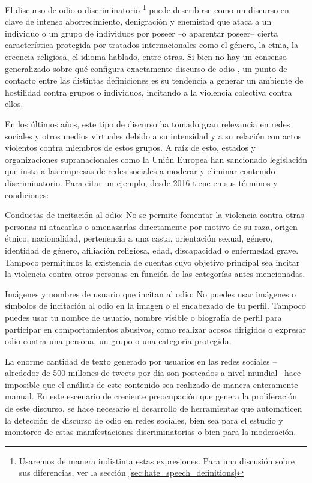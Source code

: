 
El discurso de odio o discriminatorio \footnote{Usaremos de manera indistinta estas expresiones. Para una discusión sobre sus diferencias, ver la sección \ref{sec:hate_speech_definitions}} puede describirse como un discurso en clave de intenso aborrecimiento, denigración y enemistad que ataca a un individuo o un grupo de individuos por poseer --o aparentar poseer-- cierta característica protegida por tratados internacionales como el género, la etnia, la creencia religiosa, el idioma hablado, entre otras. Si bien no hay un consenso generalizado sobre qué configura exactamente discurso de odio \cite{article192015}, un punto de contacto entre las distintas definiciones es su tendencia a generar un ambiente de hostilidad contra grupos o individuos, incitando a la violencia colectiva contra ellos.

En los últimos años, este tipo de discurso ha tomado gran relevancia en redes sociales y otros medios virtuales debido a su intensidad y a su relación con actos violentos contra miembros de estos grupos. A raíz de esto, estados y organizaciones supranacionales como la Unión Europea han sancionado legislación que insta a las empresas de redes sociales a moderar y eliminar contenido discriminatorio. Para citar un ejemplo, desde 2016 \twitter{} tiene en sus términos y condiciones:

\begin{displayquote}
    Conductas de incitación al odio: No se permite fomentar la violencia contra otras personas ni atacarlas o amenazarlas directamente por motivo de su raza, origen étnico, nacionalidad, pertenencia a una casta, orientación sexual, género, identidad de género, afiliación religiosa, edad, discapacidad o enfermedad grave. Tampoco permitimos la existencia de cuentas cuyo objetivo principal sea incitar la violencia contra otras personas en función de las categorías antes mencionadas.

    Imágenes y nombres de usuario que incitan al odio: No puedes usar imágenes o símbolos de incitación al odio en la imagen o el encabezado de tu perfil. Tampoco puedes usar tu nombre de usuario, nombre visible o biografía de perfil para participar en comportamientos abusivos, como realizar acosos dirigidos o expresar odio contra una persona, un grupo o una categoría protegida.
\end{displayquote}

La enorme cantidad de texto generado por usuarios en las redes sociales --alrededor de 500 millones de tweets por día son posteados a nivel mundial-- hace imposible que el análisis de este contenido sea realizado de manera enteramente manual. En este escenario de creciente preocupación que genera la proliferación de este discurso, se hace necesario el desarrollo de herramientas que automaticen la detección de discurso de odio en redes sociales, bien sea para el estudio y monitoreo de estas manifestaciones discriminatorias o bien para la moderación.

